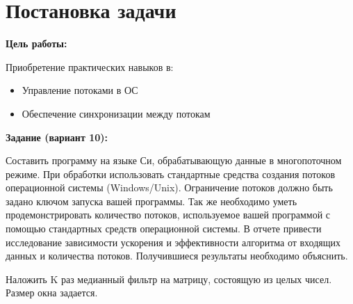 \section{Постановка задачи}

{\bfseries Цель работы:} 

Приобретение практических навыков в:

\begin{itemize}
    \item Управление потоками в ОС
    \item Обеспечение синхронизации между потокам
\end{itemize}

{\bfseries Задание (вариант 10):} 

Составить программу на языке Си, обрабатывающую данные в многопоточном режиме. При обработки использовать стандартные средства создания потоков операционной системы (Windows/Unix). Ограничение потоков должно быть задано ключом
запуска вашей программы. Так же необходимо уметь продемонстрировать количество потоков, используемое вашей программой с помощью стандартных средств операционной системы. В отчете привести исследование зависимости ускорения и эффективности алгоритма от входящих данных и количества потоков. Получившиеся результаты необходимо объяснить.

Наложить K раз медианный фильтр на матрицу, состоящую из целых чисел. Размер окна задается.

\pagebreak
